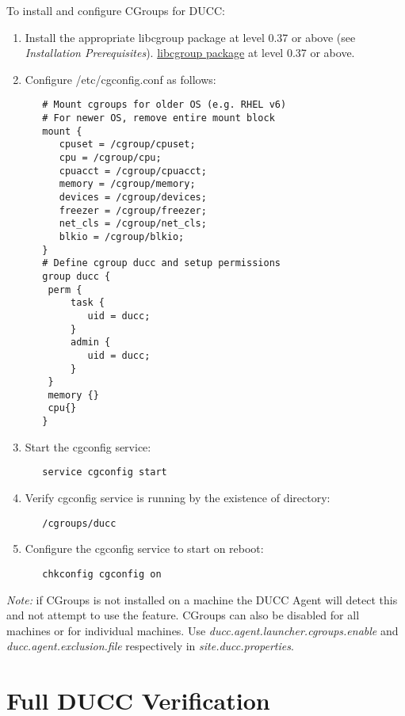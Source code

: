     To install and configure CGroups for DUCC:
    \begin{enumerate}
       \item Install the appropriate 
   \ifdefined\DUCCSTANDALONE
   libcgroup package at level 0.37 or above (see {\em Installation Prerequisites}).
   \else
   \hyperref[sec:install.prerequisites]{libcgroup package} at level 0.37 or above.
   \fi

       \item Configure /etc/cgconfig.conf as follows:
\begin{verbatim}
   # Mount cgroups for older OS (e.g. RHEL v6)
   # For newer OS, remove entire mount block 
   mount {
      cpuset = /cgroup/cpuset;
      cpu = /cgroup/cpu;
      cpuacct = /cgroup/cpuacct;
      memory = /cgroup/memory;
      devices = /cgroup/devices;
      freezer = /cgroup/freezer;
      net_cls = /cgroup/net_cls;
      blkio = /cgroup/blkio;
   }
   # Define cgroup ducc and setup permissions
   group ducc {
    perm {
        task {
           uid = ducc;
        }
        admin {
           uid = ducc;
        }
    }
    memory {}
    cpu{}
   }
\end{verbatim}
       \item Start the cgconfig service:
\begin{verbatim}
   service cgconfig start
\end{verbatim}
         
       \item Verify cgconfig service is running by the existence of directory: 
\begin{verbatim}
   /cgroups/ducc
\end{verbatim}

       \item Configure the cgconfig service to start on reboot:
\begin{verbatim}
   chkconfig cgconfig on
\end{verbatim}
    \end{enumerate}

{\em Note:} if CGroups is not installed on a machine the DUCC Agent will detect this and not 
  	attempt to use the feature. 
  	CGroups can also be disabled for all machines or for individual machines.
  	Use 
  	{\em ducc.agent.launcher.cgroups.enable} 
  	and 
  	{\em ducc.agent.exclusion.file}
  	respectively in
  	{\em site.ducc.properties}.
  	
\section{Full DUCC Verification}

